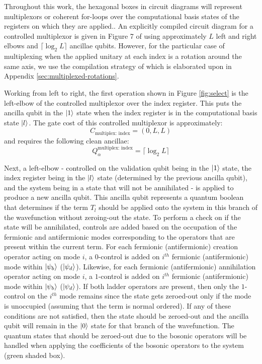 Throughout this work, the hexagonal boxes in circuit diagrams will represent multiplexors or coherent for-loops over the computational basis states of the registers on which they are applied..
An explicitly compiled circuit diagram for a controlled multiplexor is given in Figure 7 of \cite{babbush2018encoding} using approximately $L$ left and right elbows and $\lceil \log_2{L} \rceil$ ancillae qubits.
However, for the particular case of multiplexing when the applied unitary at each index is a rotation around the same axis, we use the compilation strategy of \cite{mottonen2004transformation} which is elaborated upon in Appendix \ref{sec:multiplexed-rotations}.

Working from left to right, the first operation shown in Figure \ref{fig:select} is the left-elbow of the controlled multiplexor over the index register.
This puts the ancilla qubit in the $\ket{1}$ state when the index register is in the computational basis state $\ket{l}$.
The gate cost of this controlled multiplexor is approximately:
\begin{equation}
    C_{\text{multiplex: index}} = (0, L, L)
\end{equation}
and requires the following clean ancillae:
\begin{equation}
    Q_{\alpha}^{\text{multiplex: index}} = \lceil \log_2{L} \rceil
\end{equation}

Next, a left-elbow - controlled on the validation qubit being in the $\ket{1}$ state, the index register being in the $\ket{l}$ state (determined by the previous ancilla qubit), and the system being in a state that will not be annihilated - is applied to produce a new ancilla qubit.
This ancilla qubit represents a quantum boolean that determines if the term $T_l$ should be applied onto the system in this branch of the wavefunction without zeroing-out the state.
To perform a check on if the state will be annihilated, controls are added based on the occupation of the fermionic and antifermionic modes corresponding to the operators that are present within the current term.
For each fermionic (antifermionic) creation operator acting on mode $i$, a $0$-control is added on $i^{th}$ fermionic (antifermionic) mode within $\ket{\psi_b}$ ($\ket{\psi_d}$).
Likewise, for each fermionic (antifermionic) annihilation operator acting on mode $i$, a $1$-control is added on $i^{th}$ fermionic (antifermionic) mode within $\ket{\psi_b}$ ($\ket{\psi_d}$).
If both ladder operators are present, then only the $1$-control on the $i^{th}$ mode remains since the state gets zeroed-out only if the mode is unoccupied (assuming that the term is normal ordered).
If any of these conditions are not satisfied, then the state should be zeroed-out and the ancilla qubit will remain in the $\ket{0}$ state for that branch of the wavefunction.
The quantum states that should be zeroed-out due to the bosonic operators will be handled when applying the coefficients of the bosonic operators to the system (green shaded box).

